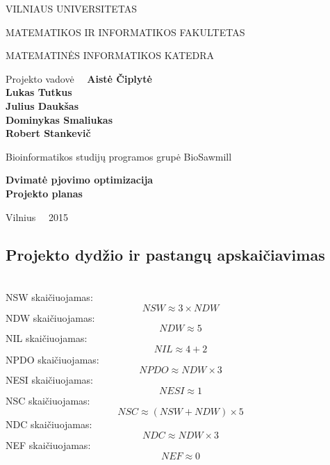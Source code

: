 \documentclass[a4paper,12pt]{article}
\begin{document}
\renewcommand{\cftdot}{.}	
\renewcommand{\cftsecleader}{\cftdotfill{\cftdotsep}}

\thispagestyle{empty} %


\begin{center}
 VILNIAUS UNIVERSITETAS 
 
MATEMATIKOS IR INFORMATIKOS FAKULTETAS

MATEMATINĖS INFORMATIKOS KATEDRA

\vspace{4cm}

Projekto vadovė \ \ \textbf{Aistė Čiplytė} \\
\textbf{Lukas Tutkus} \\
\textbf{Julius Daukšas} \\
\textbf{Dominykas Smaliukas} \\
\textbf{Robert Stankevič} \\

\vspace{0.2cm}

Bioinformatikos studijų programos grupė BioSawmill



\vspace{3cm}
\textbf{\Large Dvimatė pjovimo optimizacija}\\
\textbf{\Large Projekto planas}

\vfill

Vilnius \ \  2015
\end{center}



\clearpage

\tableofcontents
\clearpage




\setlength\parindent{24pt}




\subsection{Projekto dydžio ir pastangų apskaičiavimas}
\hfill \\
NSW skaičiuojamas:
	$$NSW \approx 3 \times NDW$$
NDW skaičiuojamas:
	$$NDW \approx 5 $$
NIL skaičiuojamas:
	$$NIL \approx 4 + 2 $$
NPDO skaičiuojamas:
	$$NPDO \approx NDW\times 3$$
NESI skaičiuojamas:
	$$NESI \approx 1 $$
NSC skaičiuojamas:
	$$NSC \approx (NSW+NDW)\times 5$$
NDC skaičiuojamas:
	$$NDC \approx NDW\times 3$$
NEF skaičiuojamas:
	$$NEF \approx 0$$
\end{document}
